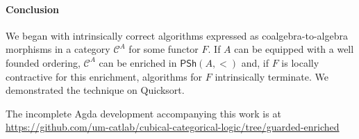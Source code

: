 \documentclass{./EasyChair3.5/easychair}
\theoremstyle{definition}
\theoremstyle{remark}
\begin{document}
\paragraph{Conclusion}
We began with intrinsically correct algorithms expressed as coalgebra-to-algebra morphisms in a category \(𝒞^A\) for some functor \(F\). If \(A\) can be equipped with a well founded ordering, \(𝒞^A\) can be enriched in \(\mathsf{PSh}(A,<)\) and, if \(F\) is locally contractive for this enrichment, algorithms for \(F\) intrinsically terminate. We demonstrated the technique on Quicksort.

The incomplete Agda development accompanying this work is at \url{https://github.com/um-catlab/cubical-categorical-logic/tree/guarded-enriched}

\printbibliography
\end{document}

